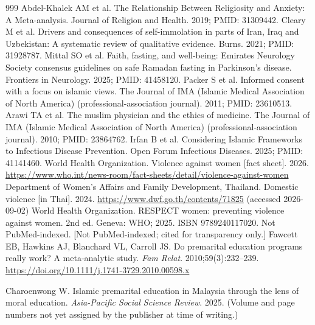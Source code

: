 \begin{thebibliography}{999}
 Abdel-Khalek AM et al. The Relationship Between Religiosity and Anxiety: A Meta-analysis. Journal of Religion and Health. 2019; PMID: 31309442.
 Cleary M et al. Drivers and consequences of self-immolation in parts of Iran, Iraq and Uzbekistan: A systematic review of qualitative evidence. Burns. 2021; PMID: 31928787.
 Mittal SO et al. Faith, fasting, and well-being: Emirates Neurology Society consensus guidelines on safe Ramadan fasting in Parkinson's disease. Frontiers in Neurology. 2025; PMID: 41458120.
 Packer S et al. Informed consent with a focus on islamic views. The Journal of IMA (Islamic Medical Association of North America) (professional-association journal). 2011; PMID: 23610513.
 Arawi TA et al. The muslim physician and the ethics of medicine. The Journal of IMA (Islamic Medical Association of North America) (professional-association journal). 2010; PMID: 23864762.
 Irfan B et al. Considering Islamic Frameworks to Infectious Disease Prevention. Open Forum Infectious Diseases. 2025; PMID: 41141460.
 World Health Organization. Violence against women [fact sheet]. 2026. \url{https://www.who.int/news-room/fact-sheets/detail/violence-against-women}
 Department of Women's Affairs and Family Development, Thailand. Domestic violence [in Thai]. 2024. \url{https://www.dwf.go.th/contents/71825} (accessed 2026-09-02)
 World Health Organization. RESPECT women: preventing violence against women. 2nd ed. Geneva: WHO; 2025. ISBN 9789240117020. Not PubMed-indexed.
 [Not PubMed-indexed; cited for transparency only.] Fawcett EB, Hawkins AJ, Blanchard VL, Carroll JS. Do premarital education programs really work? A meta-analytic study. \emph{Fam Relat}. 2010;59(3):232--239. \url{https://doi.org/10.1111/j.1741-3729.2010.00598.x}

 Charoenwong W. Islamic premarital education in Malaysia through the lens of moral education. \emph{Asia-Pacific Social Science Review}. 2025. (Volume and page numbers not yet assigned by the publisher at time of writing.)
\end{thebibliography}
